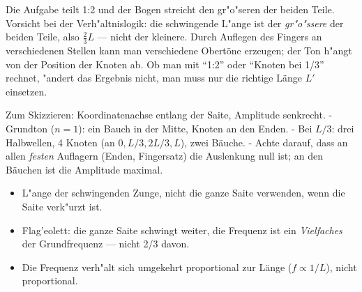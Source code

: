 \begin{achtung}
Die Aufgabe teilt 1:2 und der Bogen streicht den gr"o"seren der beiden
Teile. Vorsicht bei der Verh"altnislogik: die schwingende L"ange ist der
\emph{gr"o"ssere} der beiden Teile, also $\tfrac23L$ --- nicht der kleinere.
Durch Auflegen des Fingers an verschiedenen Stellen kann man verschiedene
Obertöne erzeugen; der Ton h"angt von der Position der Knoten ab. Ob man
mit ``1:2'' oder ``Knoten bei 1/3'' rechnet, "andert das Ergebnis nicht, man
muss nur die richtige Länge $L'$ einsetzen.
\end{achtung}

\begin{werkzeugkasten}
Zum Skizzieren: Koordinatenachse entlang der Saite, Amplitude senkrecht.
- Grundton ($n=1$): ein Bauch in der Mitte, Knoten an den Enden.
- Bei $L/3$: drei Halbwellen, 4 Knoten (an $0,L/3,2L/3,L$), zwei Bäuche.
- Achte darauf, dass an allen \emph{festen} Auflagern (Enden, Fingersatz)
  die Auslenkung null ist; an den Bäuchen ist die Amplitude maximal.
\end{werkzeugkasten}

\begin{achtung}
\begin{itemize}
  \item L"ange der schwingenden Zunge, nicht die ganze Saite verwenden,
        wenn die Saite verk"urzt ist.
  \item Flag'eolett: die ganze Saite schwingt weiter, die Frequenz ist ein
        \emph{Vielfaches} der Grundfrequenz --- nicht 2/3 davon.
  \item Die Frequenz verh"alt sich umgekehrt proportional zur Länge
        ($f\propto1/L$), nicht proportional.
\end{itemize}
\end{achtung}
